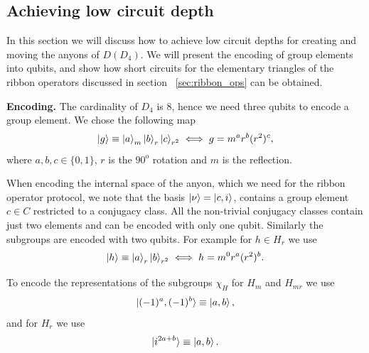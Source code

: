 \documentclass[two column]{article}
\begin{document}
\subsection{Achieving low circuit depth }\label{subsec:enc}

In this section we will discuss how to achieve low circuit depths for creating and moving the anyons of $D(D_4)$. We will present the encoding of group elements into qubits, and show how short circuits for the elementary triangles of the ribbon operators discussed in section ~\ref{sec:ribbon_ops} can be obtained.

\textbf{Encoding.} 
The cardinality of $D_4$ is 8, hence we need three qubits to encode a group element.
We chose the following map
\begin{equation}
    \ket{g} \equiv \ket{a}_m\ket{b}_r\ket{c}_{r^2} \iff g = m^a r^b (r^2)^c,
\end{equation}
where $a,b,c \in \{0,1\}$, $r$ is the $90^{\text{o}}$ rotation and $m$ is the reflection.

When encoding the internal space of the anyon, which we need for the ribbon operator protocol, we note that the basis $\ket{\nu} = \ket{c, i}$, contains a group element $c\in C$ restricted to a conjugacy class. All the non-trivial conjugacy classes contain just two elements and can be encoded with only one qubit. Similarly the subgroups are encoded with two qubits. For example for $h\in H_r$ we use\begin{equation}
    \ket{h} \equiv \ket{a}_r\ket{b}_{r^2} \iff h = m^0r^a(r^2)^b.
\end{equation}


To encode the representations of the subgroups $\chi_H$ for $H_m$ and $H_{mr}$ we use
\begin{equation}
    \ket{(-1)^a,(-1)^b} \equiv \ket{a,b},
\end{equation}
and for $H_{r}$ we use
\begin{equation}
    \ket{i^{2a+b}} \equiv \ket{a, b}.
\end{equation}
\end{document}

